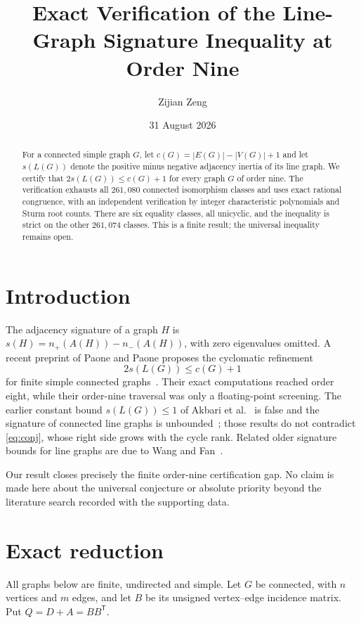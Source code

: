 \documentclass[11pt]{amsart}
\title[Line-Graph Signature at Order Nine]{Exact Verification of the Line-Graph Signature Inequality at Order Nine}
\author{Zijian Zeng}
\date{31 August 2026}
\begin{document}
\begin{abstract}
For a connected simple graph $G$, let $c(G)=|E(G)|-|V(G)|+1$ and let
$s(L(G))$ denote the positive minus negative adjacency inertia of its line
graph. We certify that $2s(L(G))\leq c(G)+1$ for every graph $G$ of order
nine. The verification exhausts all $261{,}080$ connected isomorphism
classes and uses exact rational congruence, with an independent verification
by integer characteristic polynomials and Sturm root counts. There are six
equality classes, all unicyclic, and the inequality is strict on the other
$261{,}074$ classes. This is a finite result; the universal inequality
remains open.
\end{abstract}
\maketitle

\section{Introduction}
The adjacency signature of a graph $H$ is
$s(H)=n_+(A(H))-n_-(A(H))$, with zero eigenvalues omitted. A recent
preprint of Paone and Paone proposes the cyclomatic refinement
\begin{equation}\label{eq:conj}2s(L(G))\leq c(G)+1\end{equation}
for finite simple connected graphs~\cite{paone_2026_21706797}. Their exact
computations reached order eight, while their order-nine traversal was only a
floating-point screening. The earlier constant bound $s(L(G))\leq1$ of
Akbari et al.~\cite{Akbari_2026} is false and the signature of connected line
graphs is unbounded~\cite{francis2026signatureconnectedlinegraphs}; those results do not contradict
\eqref{eq:conj}, whose right side grows with the cycle rank. Related older
signature bounds for line graphs are due to Wang and Fan~\cite{Wang_2014}.

Our result closes precisely the finite order-nine certification gap. No
claim is made here about the universal conjecture or absolute priority beyond
the literature search recorded with the supporting data.

\section{Exact reduction}
All graphs below are finite, undirected and simple. Let $G$ be connected,
with $n$ vertices and $m$ edges, and let $B$ be its unsigned vertex--edge
incidence matrix. Put $Q=D+A=BB^{\mathsf T}$.
\end{document}
